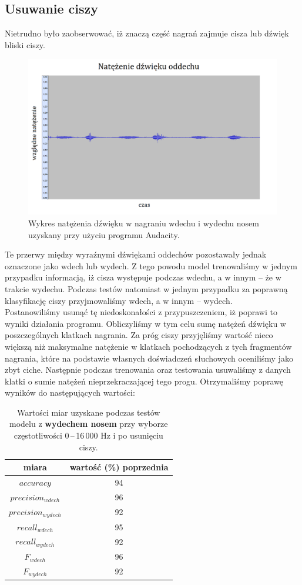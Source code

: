 \documentclass[polish]{article}
\begin{document}
\subsection{Usuwanie ciszy}
Nietrudno było zaobserwować, iż znaczą część nagrań zajmuje cisza lub dźwięk bliski ciszy.
\begin{figure}[H]
	\centering
	\includegraphics[width=13cm]{natezenie_wydech_nosem}
	\caption{Wykres natężenia dźwięku w nagraniu wdechu i wydechu nosem uzyskany przy użyciu programu Audacity.}
\end{figure}
Te przerwy między wyraźnymi dźwiękami oddechów pozostawały jednak oznaczone jako wdech lub wydech. Z tego powodu model trenowaliśmy w jednym przypadku informacją, iż cisza występuje podczas wdechu, a w innym -- że w trakcie wydechu. Podczas testów natomiast w jednym przypadku za poprawną klasyfikację ciszy przyjmowaliśmy wdech, a w innym -- wydech. \\
\indent Postanowiliśmy usunąć tę niedoskonałości z przypuszczeniem, iż poprawi to wyniki działania programu. Obliczyliśmy w tym celu sumę natężeń dźwięku w poszczególnych klatkach nagrania. Za próg ciszy przyjęliśmy wartość nieco większą niż maksymalne natężenie w klatkach pochodzących z tych fragmentów nagrania, które na podstawie własnych doświadczeń słuchowych oceniliśmy jako zbyt ciche. Następnie podczas trenowania oraz testowania usuwaliśmy z danych klatki o sumie natężeń nieprzekraczającej tego progu. Otrzymaliśmy poprawę wyników do następujących wartości:
\begin{table}[H]
\caption{Wartości miar uzyskane podczas testów modelu z \textbf{wydechem nosem} przy wyborze częstotliwości 0\,--\,16\,000 \unit{Hz} i po usunięciu ciszy.}
\begin{center}
\begin{tabular}{c | c}
	miara & wartość (\%) poprzednia\\
	\hline
	$accuracy$ & 94 \\
	$precision_{wdech}$ & 96 \\
	$precision_{wydech}$ & 92 \\
	$recall_{wdech}$ & 95 \\
	$recall_{wydech}$ & 92 \\
	$F_{wdech}$ & 96 \\
	$F_{wydech}$ & 92
\end{tabular}
\end{center}
\end{table}
\end{document}
